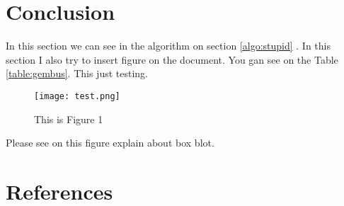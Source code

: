 \documentclass[conference]{IEEEtran}
\begin{document}
\section{Conclusion}
In this section we can see in the algorithm on section \ref{algo:stupid} . In this section I also try to insert figure on the document. You gan see on the Table \ref{table:gembus}. This just testing.
\begin{figure}
	\texttt{[image: test.png]}
	\caption{This is Figure 1}
	\label{fig:gambar}
\end{figure}
Please see on  this figure explain about box blot.


\section{References}


\end{document}
